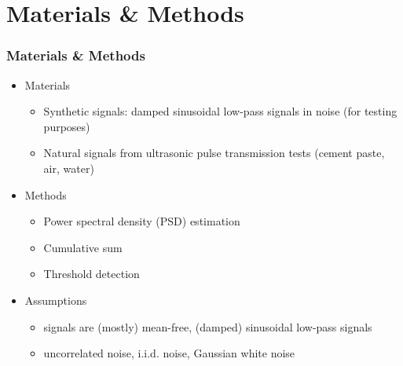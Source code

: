 \documentclass[11pt,aspectratio=169]{beamer}
\begin{document}
	\section{Materials \& Methods}
	\begin{frame}
		\frametitle{Materials \& Methods}
		\begin{itemize}
			\item \parbox{20mm}{\textcolor{RIPtitlecol}{Materials}}
				\begin{itemize}
					\item Synthetic signals: damped sinusoidal low-pass signals in noise (for testing purposes)
					\item Natural signals from ultrasonic pulse transmission tests (cement paste, air, water)
				\end{itemize}
			\item \parbox{20mm}{\textcolor{RIPtitlecol}{Methods}}
				\begin{itemize}
					\item Power spectral density (PSD) estimation
					\item Cumulative sum
					\item Threshold detection
				\end{itemize}
			\item \parbox{20mm}{\textcolor{RIPtitlecol}{Assumptions}}
			\begin{itemize}
				\item signals are (mostly) mean-free, (damped) sinusoidal low-pass signals
				\item uncorrelated noise, i.i.d. noise, Gaussian white noise
			\end{itemize}
		\end{itemize}
	\end{frame}
\end{document}

